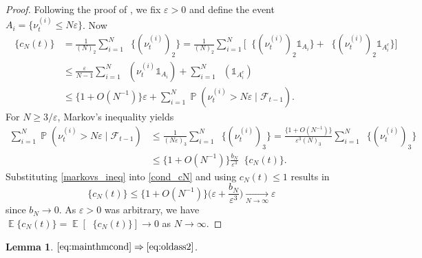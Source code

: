 \documentclass{article}
\newtheorem{lemma}{Lemma}
\theoremstyle{definition}
\DeclareMathOperator{\Prob}{\mathbb{P}}
\DeclareMathOperator{\E}{\mathbb{E}}
\DeclareMathOperator{\Et}{\mathbb{E}_t}
\newcommand{\1}[1]{\mathbbm{1}_{\{#1\}}}
\begin{document}
\begin{proof}
Following the proof of \citet[Lemma 5.5]{mohle2003}, we fix $\varepsilon > 0$ and define the event $A_i = \{ \nu_t^{(i)} \leq N \varepsilon \}$.
Now
\begin{align}
\Et\{ c_N( t ) \} &= \frac{ 1 }{ ( N )_2 } \sum_{ i = 1 }^N \Et\{ ( \nu_t^{(i)} )_2\} 
= \frac{ 1 }{ ( N )_2 } \sum_{ i = 1 }^N \Big[ \Et\{ ( \nu_t^{(i)} )_2 \mathds{ 1 }_{ A_i } \} + \Et\{ ( \nu_t^{(i)} )_2 \mathds{ 1 }_{ A_i^c } \} \Big] \nonumber \\
&\leq \frac{ \varepsilon }{ N - 1 } \sum_{ i = 1 }^N \Et( \nu_t^{(i)} \mathds{ 1 }_{ A_i }) + \sum_{ i = 1 }^N \Et( \mathds{ 1 }_{ A_i^c }) \nonumber \\
&\leq \{ 1 + O( N^{ -1 } ) \} \varepsilon + \sum_{ i = 1 }^N \Prob( \nu_t^{(i)} > N \varepsilon \mid \mathcal{F}_{t-1}). \label{cond_cN}
\end{align}
For $N \geq 3 / \varepsilon$, Markov's inequality yields
\begin{align}
\sum_{ i = 1 }^N \Prob( \nu_t^{(i)} > N \varepsilon \mid \mathcal{F}_{t-1} ) &\leq \frac{ 1 }{ ( N \varepsilon )_3 } \sum_{ i = 1 }^N \Et\{ ( \nu_t^{(i)} )_3\} = \frac{ \{ 1 + O( N^{ -1 } ) \} }{ \varepsilon^3 ( N )_3 } \sum_{ i = 1 }^N \Et\{ ( \nu_t^{(i)} )_3\} \nonumber \\
&\leq \{ 1 + O( N^{ -1 } ) \} \frac{ b_N }{ \varepsilon^3 } \Et\{ c_N( t )\}. \label{markovs_ineq}
\end{align}
Substituting \eqref{markovs_ineq} into \eqref{cond_cN} and using $c_N( t ) \leq 1$ results in
\begin{equation*}
\Et\{ c_N( t )\} \leq \{ 1 + O( N^{ -1 } ) \} \Bigg( \varepsilon + \frac{ b_N }{ \varepsilon^3 } \Bigg) \underset{N\to\infty}{\longrightarrow} \varepsilon
\end{equation*}
since $b_N \rightarrow 0$. 
As $\varepsilon > 0$ was arbitrary, we have
$
\E\{ c_N( t ) \} = \E[ \Et\{ c_N( t ) \} ] \rightarrow 0
$
as $N \rightarrow \infty$.
\end{proof}

\begin{lemma} \label{lem:removeass2}
$\eqref{eq:mainthmcond} \Rightarrow \eqref{eq:oldass2}$.
\end{lemma}
\end{document}
